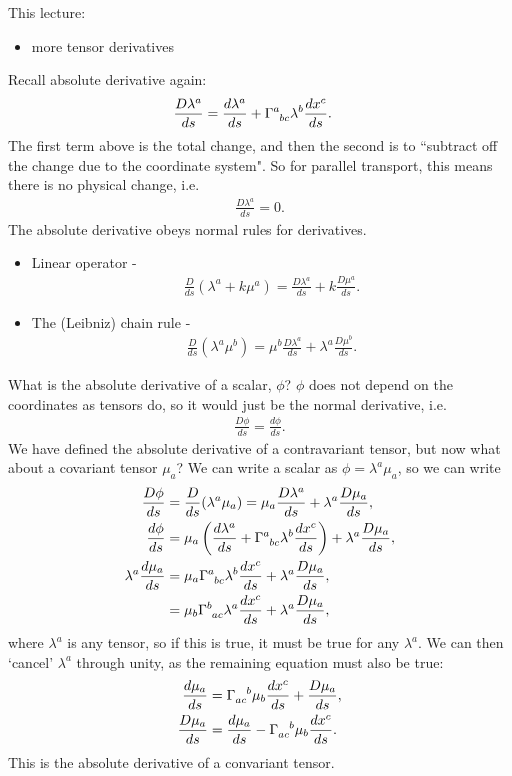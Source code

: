 \documentclass[a4paper, 11pt, normalem]{report}
\begin{document}
This lecture:
\begin{itemize}
    \item more tensor derivatives
\end{itemize}
Recall absolute derivative again:
        \begin{align}
            \frac{D\lambda^a}{ds} &= \frac{d\lambda^a}{ds} + \tensor{\Gamma}{^a_{bc}}\lambda^b\frac{dx^c}{ds}.
        \end{align}
The first term above is the total change, and then the second is to ``subtract off the change due to the coordinate system".
So for parallel transport, this means there is no physical change, i.e.
\begin{align}
    \frac{D\lambda^a}{ds} = 0.
\end{align}
The absolute derivative obeys normal rules for derivatives.
\begin{itemize}
    \item Linear operator -
        \begin{align}
            \frac{D}{ds}\left(\lambda^a+ k\mu^a\right) = \frac{D\lambda^a}{ds} + k\frac{D\mu^a}{ds}.
        \end{align}
    \item The (Leibniz) chain rule -
        \begin{align}
            \frac{D}{ds}\left(\lambda^a\mu^b\right) = \mu^b\frac{D\lambda^a}{ds} + \lambda^a\frac{D\mu^b}{ds}.
        \end{align}
\end{itemize}
What is the absolute derivative of a scalar, $\phi$?
$\phi$ does not depend on the coordinates as tensors do, so it would just be the normal derivative, i.e. 
\begin{align}
    \frac{D\phi}{ds} = \frac{d\phi}{ds}.
\end{align}
We have defined the absolute derivative of a contravariant tensor, but now what about a covariant tensor $\mu_a$?
We can write a scalar as $\phi=\lambda^a\mu_a$, so we can write
\begin{align}
    \frac{D\phi}{ds} &= \frac{D}{ds}(\lambda^a\mu_a) = \mu_a\frac{D\lambda^a}{ds}+\lambda^a\frac{D\mu_a}{ds}, \\
    \frac{d\phi}{ds} &= \mu_a\left(\frac{d\lambda^a}{ds} + \tensor{\Gamma}{^a_{bc}}\lambda^b\frac{dx^c}{ds}\right) + \lambda^a\frac{D\mu_a}{ds}, \\
    \lambda^a\frac{d\mu_a}{ds} &= \mu_a\tensor{\Gamma}{^a_{bc}}\lambda^b\frac{dx^c}{ds} + \lambda^a\frac{D\mu_a}{ds}, \\
                               &= \mu_b\tensor{\Gamma}{^b_{ac}}\lambda^a\frac{dx^c}{ds} + \lambda^a\frac{D\mu_a}{ds},
\end{align}
where $\lambda^a$ is any tensor, so if this is true, it must be true for any $\lambda^a$.
We can then `cancel' $\lambda^a$ through unity, as the remaining equation must also be true:
\begin{align}
    \frac{d\mu_a}{ds} &= \tensor{\Gamma}{_{ac}^b}\mu_b\frac{dx^c}{ds} + \frac{D\mu_a}{ds}, \\
    \frac{D\mu_a}{ds} &= \frac{d\mu_a}{ds} - \tensor{\Gamma}{_{ac}^b}\mu_b\frac{dx^c}{ds}.
\end{align}
This is the absolute derivative of a convariant tensor. 
\end{document}
